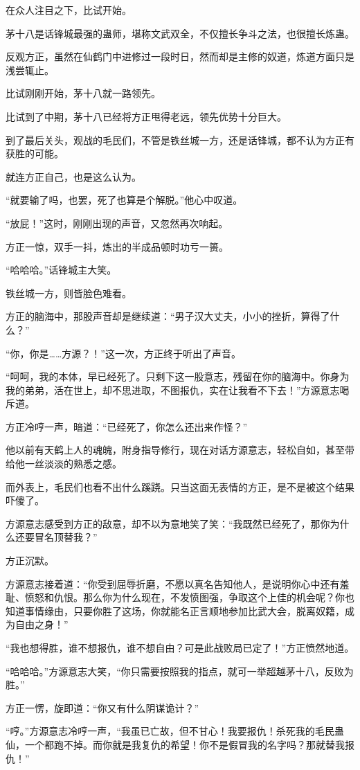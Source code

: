 \begin{this_body}
在众人注目之下，比试开始。

茅十八是话锋城最强的蛊师，堪称文武双全，不仅擅长争斗之法，也很擅长炼蛊。

反观方正，虽然在仙鹤门中进修过一段时日，然而却是主修的奴道，炼道方面只是浅尝辄止。

比试刚刚开始，茅十八就一路领先。

比试到了中期，茅十八已经将方正甩得老远，领先优势十分巨大。

到了最后关头，观战的毛民们，不管是铁丝城一方，还是话锋城，都不认为方正有获胜的可能。

就连方正自己，也是这么认为。

“就要输了吗，也罢，死了也算是个解脱。”他心中叹道。

“放屁！”这时，刚刚出现的声音，又忽然再次响起。

方正一惊，双手一抖，炼出的半成品顿时功亏一篑。

“哈哈哈。”话锋城主大笑。

铁丝城一方，则皆脸色难看。

方正的脑海中，那股声音却是继续道：“男子汉大丈夫，小小的挫折，算得了什么？”

“你，你是……方源？！”这一次，方正终于听出了声音。

“呵呵，我的本体，早已经死了。只剩下这一股意志，残留在你的脑海中。你身为我的弟弟，活在世上，却不思进取，不图报仇，实在让我看不下去！”方源意志喝斥道。

方正冷哼一声，暗道：“已经死了，你怎么还出来作怪？”

他以前有天鹤上人的魂魄，附身指导修行，现在对话方源意志，轻松自如，甚至带给他一丝淡淡的熟悉之感。

而外表上，毛民们也看不出什么蹊跷。只当这面无表情的方正，是不是被这个结果吓傻了。

方源意志感受到方正的敌意，却不以为意地笑了笑：“我既然已经死了，那你为什么还要冒名顶替我？”

方正沉默。

方源意志接着道：“你受到屈辱折磨，不愿以真名告知他人，是说明你心中还有羞耻、愤怒和仇恨。那么你为什么现在，不发愤图强，争取这个上佳的机会呢？你也知道事情缘由，只要你胜了这场，你就能名正言顺地参加比武大会，脱离奴籍，成为自由之身！”

“我也想得胜，谁不想报仇，谁不想自由？可是此战败局已定了！”方正愤然地道。

“哈哈哈。”方源意志大笑，“你只需要按照我的指点，就可一举超越茅十八，反败为胜。”

方正一愣，旋即道：“你又有什么阴谋诡计？”

“哼。”方源意志冷哼一声，“我虽已亡故，但不甘心！我要报仇！杀死我的毛民蛊仙，一个都跑不掉。而你就是我复仇的希望！你不是假冒我的名字吗？那就替我报仇！”


\end{this_body}
